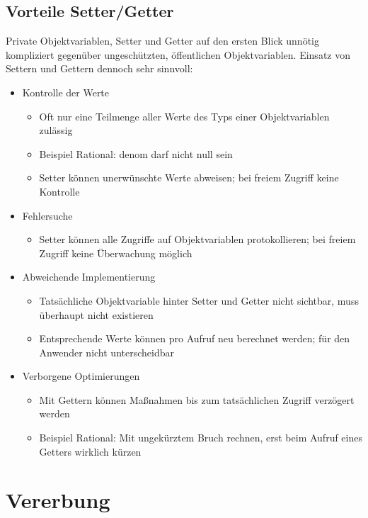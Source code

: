 \subsection{Vorteile Setter/Getter}
Private Objektvariablen, Setter und Getter auf den ersten Blick unnötig kompliziert gegenüber ungeschützten, öffentlichen Objektvariablen. Einsatz von Settern und Gettern dennoch sehr sinnvoll:
\begin{itemize}
\item Kontrolle der Werte
\begin{itemize}
\item Oft nur eine Teilmenge aller Werte des Typs einer Objektvariablen zulässig
\item Beispiel Rational: denom darf nicht null sein
\item Setter können unerwünschte Werte abweisen; bei freiem Zugriff keine Kontrolle
\end{itemize}
\item Fehlersuche
\begin{itemize}
\item Setter können alle Zugriffe auf Objektvariablen protokollieren; bei freiem Zugriff keine Überwachung möglich
\end{itemize}
\item Abweichende Implementierung
\begin{itemize}
\item Tatsächliche Objektvariable hinter Setter und Getter nicht sichtbar, muss überhaupt nicht existieren
\item Entsprechende Werte können pro Aufruf neu berechnet werden; für den Anwender nicht unterscheidbar
\end{itemize}
\item Verborgene Optimierungen
\begin{itemize}
\item Mit Gettern können Maßnahmen bis zum tatsächlichen Zugriff verzögert werden
\item Beispiel Rational: Mit ungekürztem Bruch rechnen, erst beim Aufruf eines Getters wirklich kürzen
\end{itemize}
\end{itemize}
%
%
%
\section{Vererbung}

